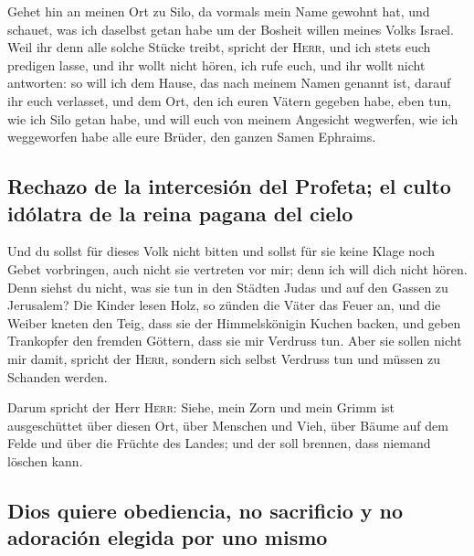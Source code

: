  Gehet hin an meinen Ort zu Silo, da vormals mein Name
gewohnt hat, und schauet, was ich daselbst getan habe um der Bosheit
willen meines Volks Israel.  Weil ihr denn alle solche
Stücke treibt, spricht der \textsc{Herr}, und ich stets euch predigen
lasse, und ihr wollt nicht hören, ich rufe euch, und ihr wollt nicht
antworten:  so will ich dem Hause, das nach meinem Namen
genannt ist, darauf ihr euch verlasset, und dem Ort, den ich euren
Vätern gegeben habe, eben tun, wie ich Silo getan habe, 
und will euch von meinem Angesicht wegwerfen, wie ich weggeworfen habe
alle eure Brüder, den ganzen Samen Ephraims.

\hypertarget{rechazo-de-la-intercesiuxf3n-del-profeta-el-culto-iduxf3latra-de-la-reina-pagana-del-cielo}{%
\subsection{Rechazo de la intercesión del Profeta; el culto idólatra de
la reina pagana del
cielo}\label{rechazo-de-la-intercesiuxf3n-del-profeta-el-culto-iduxf3latra-de-la-reina-pagana-del-cielo}}

 Und du sollst für dieses Volk nicht bitten und sollst
für sie keine Klage noch Gebet vorbringen, auch nicht sie vertreten vor
mir; denn ich will dich nicht hören.  Denn siehst du
nicht, was sie tun in den Städten Judas und auf den Gassen zu Jerusalem?
 Die Kinder lesen Holz, so zünden die Väter das Feuer an,
und die Weiber kneten den Teig, dass sie der Himmelskönigin Kuchen
backen, und geben Trankopfer den fremden Göttern, dass sie mir Verdruss
tun.  Aber sie sollen nicht mir damit, spricht der
\textsc{Herr}, sondern sich selbst Verdruss tun und müssen zu Schanden
werden.

 Darum spricht der Herr \textsc{Herr}: Siehe, mein Zorn
und mein Grimm ist ausgeschüttet über diesen Ort, über Menschen und
Vieh, über Bäume auf dem Felde und über die Früchte des Landes; und der
soll brennen, dass niemand löschen kann.

\hypertarget{dios-quiere-obediencia-no-sacrificio-y-no-adoraciuxf3n-elegida-por-uno-mismo}{%
\subsection{Dios quiere obediencia, no sacrificio y no adoración elegida
por uno
mismo}\label{dios-quiere-obediencia-no-sacrificio-y-no-adoraciuxf3n-elegida-por-uno-mismo}}

